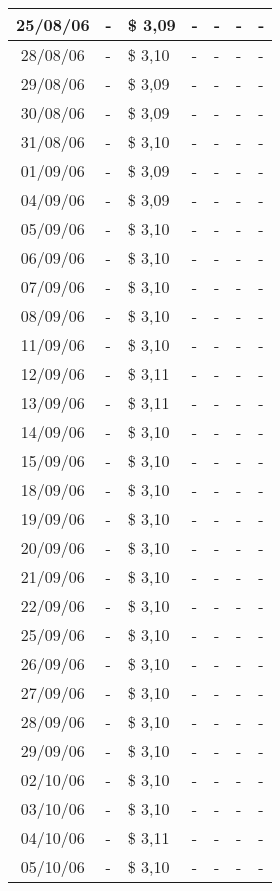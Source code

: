 \begin{center}
\begin{longtable}{|c|p{1.5cm}|p{1.5cm}|p{1.5cm}|p{1.5cm}|p{1.5cm}|p{1.5cm}|}
25/08/06 & - & \$ 3,09 & - & - & - & - \\ \hline
28/08/06 & - & \$ 3,10 & - & - & - & - \\ \hline
29/08/06 & - & \$ 3,09 & - & - & - & - \\ \hline
30/08/06 & - & \$ 3,09 & - & - & - & - \\ \hline
31/08/06 & - & \$ 3,10 & - & - & - & - \\ \hline
01/09/06 & - & \$ 3,09 & - & - & - & - \\ \hline
04/09/06 & - & \$ 3,09 & - & - & - & - \\ \hline
05/09/06 & - & \$ 3,10 & - & - & - & - \\ \hline
06/09/06 & - & \$ 3,10 & - & - & - & - \\ \hline
07/09/06 & - & \$ 3,10 & - & - & - & - \\ \hline
08/09/06 & - & \$ 3,10 & - & - & - & - \\ \hline
11/09/06 & - & \$ 3,10 & - & - & - & - \\ \hline
12/09/06 & - & \$ 3,11 & - & - & - & - \\ \hline
13/09/06 & - & \$ 3,11 & - & - & - & - \\ \hline
14/09/06 & - & \$ 3,10 & - & - & - & - \\ \hline
15/09/06 & - & \$ 3,10 & - & - & - & - \\ \hline
18/09/06 & - & \$ 3,10 & - & - & - & - \\ \hline
19/09/06 & - & \$ 3,10 & - & - & - & - \\ \hline
20/09/06 & - & \$ 3,10 & - & - & - & - \\ \hline
21/09/06 & - & \$ 3,10 & - & - & - & - \\ \hline
22/09/06 & - & \$ 3,10 & - & - & - & - \\ \hline
25/09/06 & - & \$ 3,10 & - & - & - & - \\ \hline
26/09/06 & - & \$ 3,10 & - & - & - & - \\ \hline
27/09/06 & - & \$ 3,10 & - & - & - & - \\ \hline
28/09/06 & - & \$ 3,10 & - & - & - & - \\ \hline
29/09/06 & - & \$ 3,10 & - & - & - & - \\ \hline
02/10/06 & - & \$ 3,10 & - & - & - & - \\ \hline
03/10/06 & - & \$ 3,10 & - & - & - & - \\ \hline
04/10/06 & - & \$ 3,11 & - & - & - & - \\ \hline
05/10/06 & - & \$ 3,10 & - & - & - & - \\ \hline

\end{longtable}
\end{center}
